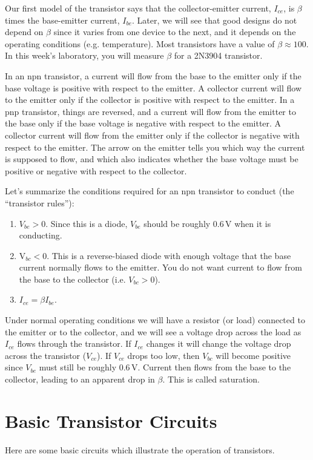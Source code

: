 \documentclass{article}
\begin{document}
Our first model of the transistor says that the collector-emitter current, $I_{ce}$, is $\beta$ times the base-emitter current, $I_{be}$. Later, we will see that good designs do not depend on $\beta$ since it varies from one device to the next, and it depends on the operating conditions (e.g. temperature). Most transistors have a value of $\beta \approx 100$. In this week's laboratory, you will measure $\beta$ for a 2N3904 transistor. 

In an npn transistor, a current will flow from the base to the emitter only if the base voltage is positive with respect to the emitter. A collector current will flow to the emitter only if the collector is positive with respect to the emitter. In a pnp transistor, things are reversed, and a current will flow from the emitter to the base only if the base voltage is negative with respect to the emitter. A collector current will flow from the emitter only if the collector is negative with respect to the emitter. The arrow on the emitter tells you which way the current is supposed to flow, and which also indicates whether the base voltage must be positive or negative with respect to the collector.

Let's summarize the conditions required for an npn transistor to conduct (the ``transistor rules''):
\begin{enumerate}
\item $V_{be} > 0$.  Since this is a diode, $V_{be}$ should be roughly 0.6\,V when it is conducting.
\item V$_{bc} < 0$. This is a reverse-biased diode with enough voltage that the base current normally flows to the emitter. You do not want current to flow from the base to the collector (i.e. $V_{bc} > 0$).
\item $I_{ce} = \beta I_{be}$.
\end{enumerate}

Under normal operating conditions we will have a resistor (or load) connected to the emitter or to the collector, and we will see a voltage drop across the load as $I_{ce}$ flows through the transistor. If $I_{ce}$ changes it will change the voltage drop across the transistor ($V_{ce}$). If $V_{ce}$ drops too low, then $V_{bc}$ will become positive since $V_{be}$ must still be roughly 0.6\,V. Current then flows from the base to the collector, leading to an apparent drop in $\beta$. This is called saturation.

\section{Basic Transistor Circuits}
Here are some basic circuits which illustrate the operation of transistors.
\end{document}
